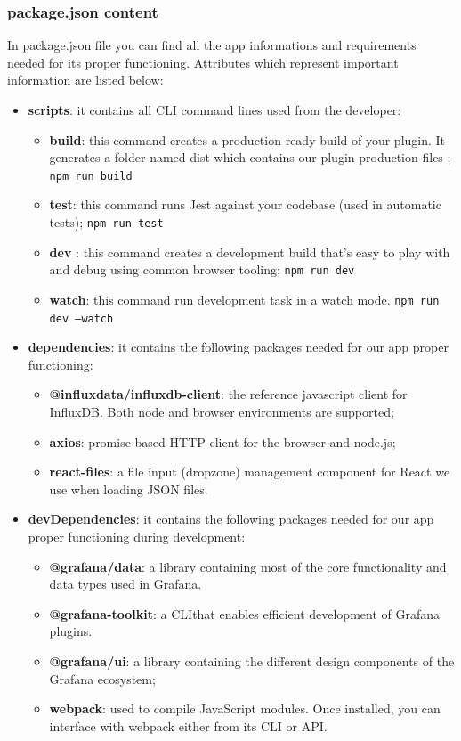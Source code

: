 		\subsubsection{package.json content}
In package.json file you can find all the app informations and requirements needed for its proper functioning. Attributes which represent important information are listed below:
		\begin{itemize}
			\item\textbf{scripts}: it contains all CLI command lines used from the developer: 
				\begin{itemize}
				\item\textbf{build}: this command creates a production-ready build of your plugin. It generates a folder named dist which contains our plugin production files ;
				\newline\texttt{npm run build}
				\item\textbf{test}: this command runs Jest against your codebase (used in automatic tests);
				\newline\texttt{npm run test}
				\item\textbf{dev} : this command creates a development build that's easy to play with and debug using common browser tooling;
				\newline\texttt{npm run dev}
				\item\textbf{watch}: this command run development task in a watch mode.
				\newline\texttt{npm run dev --watch}
			\end{itemize}
			\item\textbf{dependencies}: it contains the following packages needed for our app proper functioning:
			\begin{itemize}
				\item\textbf{@influxdata/influxdb-client}: the reference javascript client for InfluxDB. Both node and browser environments are supported;
    			\item\textbf{axios}: promise based HTTP client for the browser and node.js;
    			\item\textbf{react-files}: a file input (dropzone) management component for React we use when loading JSON files.
			\end{itemize}
			\item\textbf{devDependencies}: it contains the following packages needed for our app proper functioning during development:
			\begin{itemize}
				\item\textbf{@grafana/data}: a library containing most of the core functionality and data types used in Grafana.
				\item\textbf{@grafana-toolkit}: a CLI\glo that enables efficient development of Grafana plugins.
				\item\textbf{@grafana/ui}: a library containing the different design components of the Grafana ecosystem;
				\item\textbf{webpack}: used to compile JavaScript modules. Once installed, you can interface with webpack either from its CLI or API.
			\end{itemize}
		\end{itemize}
		
